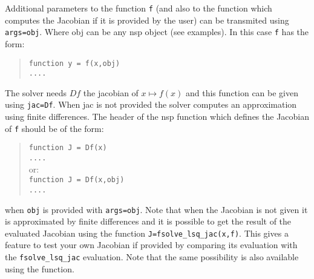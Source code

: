 \begin{mandescription}
Additional parameters to the function \verb+f+ (and also to the function which computes the Jacobian 
if it is provided by the user) can be transmited using \verb+args=obj+. Where obj can be any nsp 
object (see examples). In this case \verb+f+ has the form:
\begin{quote}
{\tt function y = f(x,obj) \\
      ....}
\end{quote}

The solver needs $Df$ the jacobian of $x \mapsto f(x)$ and this function can be given using 
\verb+jac=Df+. When jac is not provided the solver computes an approximation using finite differences. 
The header of the nsp function which defines the Jacobian of \verb+f+ should be of the form:
\begin{quote}
{\tt function J = Df(x) \\
      ....}\\
or:\\
{\tt function J = Df(x,obj) \\
     ....}
\end{quote}
when {\tt obj} is provided with {\tt args=obj}. 
Note that when the Jacobian is not given it is approximated by finite differences and it is 
possible to get the result of the evaluated Jacobian using the function \verb+J=fsolve_lsq_jac(x,f)+.
This gives a feature to test your own Jacobian if provided by comparing its evaluation with the 
\verb+fsolve_lsq_jac+ evaluation. Note that the same possibility is also available using the 
 function. 

\end{mandescription} 

